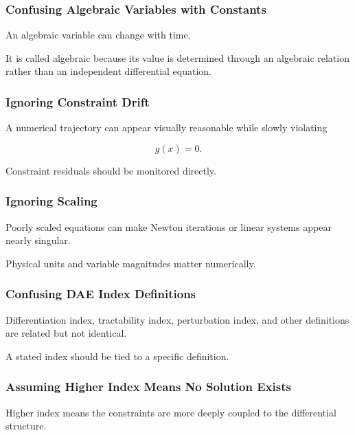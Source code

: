 \subsubsection{Confusing Algebraic Variables with Constants}

An algebraic variable can change with time.

It is called algebraic because its value is determined through an
algebraic relation rather than an independent differential equation.

\subsubsection{Ignoring Constraint Drift}

A numerical trajectory can appear visually reasonable while slowly
violating

\[
g(x)=0.
\]

Constraint residuals should be monitored directly.

\subsubsection{Ignoring Scaling}

Poorly scaled equations can make Newton iterations or linear systems
appear nearly singular.

Physical units and variable magnitudes matter numerically.

\subsubsection{Confusing DAE Index Definitions}

Differentiation index, tractability index, perturbation index, and other
definitions are related but not identical.

A stated index should be tied to a specific definition.

\subsubsection{Assuming Higher Index Means No Solution Exists}

Higher index means the constraints are more deeply coupled to the
differential structure.

